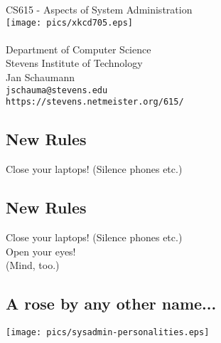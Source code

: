 \documentclass[xga]{xdvislides}
\begin{document}
\setfontphv

\lhead{\slidetitle}				%
\cfoot{\relax}					%
\rfoot{\Gray{\today}}

\vspace*{\fill}
\begin{center}
	\Hugesize
		CS615 - Aspects of System Administration\\ [1em]
		\texttt{[image: pics/xkcd705.eps]} \\
	\hspace*{5mm}\blueline\\ [1em]
	\Normalsize
		Department of Computer Science\\
		Stevens Institute of Technology\\
		Jan Schaumann\\
		\verb+jschauma@stevens.edu+ \\
		\verb+https://stevens.netmeister.org/615/+
\end{center}
\vspace*{\fill}

\subsection{New Rules}
\Hugesize
\vspace*{\fill}
\begin{center}
Close your laptops! (Silence phones etc.)
\end{center}
\vspace*{\fill}
\Normalsize

\subsection{New Rules}
\Hugesize
\vspace*{\fill}
\begin{center}
Close your laptops! (Silence phones etc.) \\
\vspace{.5in}
Open your eyes! \\
\small
(Mind, too.)
\end{center}
\vspace*{\fill}
\Normalsize

\subsection{A rose by any other name...}
\vspace*{\fill}
\begin{center}
	\texttt{[image: pics/sysadmin-personalities.eps]} \\
\end{center}
\vspace*{\fill}
\end{document}

